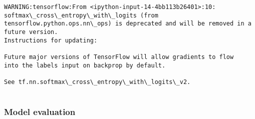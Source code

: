 \documentclass[11pt]{article}
\begin{document}
    \begin{Verbatim}[commandchars=\\\{\}]
WARNING:tensorflow:From <ipython-input-14-4bb113b26401>:10: softmax\_cross\_entropy\_with\_logits (from tensorflow.python.ops.nn\_ops) is deprecated and will be removed in a future version.
Instructions for updating:

Future major versions of TensorFlow will allow gradients to flow
into the labels input on backprop by default.

See tf.nn.softmax\_cross\_entropy\_with\_logits\_v2.


    \end{Verbatim}

    \subsubsection{Model evaluation}\label{model-evaluation}
\end{document}
